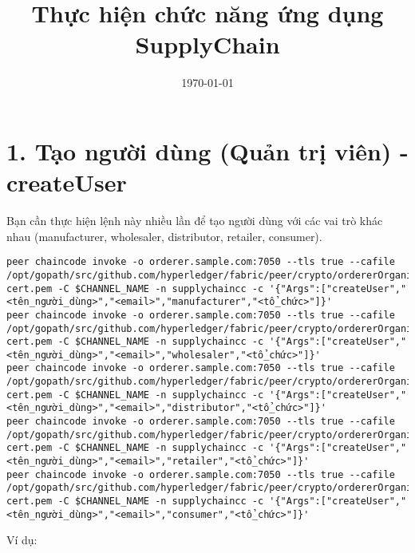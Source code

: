 \documentclass{article}
\title{Thực hiện chức năng ứng dụng SupplyChain}
\date{\today}
\begin{document}
\maketitle

\section{1. Tạo người dùng (Quản trị viên) - createUser}

Bạn cần thực hiện lệnh này nhiều lần để tạo người dùng với các vai trò khác nhau (manufacturer, wholesaler, distributor, retailer, consumer).

\begin{lstlisting}[breaklines=true]
peer chaincode invoke -o orderer.sample.com:7050 --tls true --cafile /opt/gopath/src/github.com/hyperledger/fabric/peer/crypto/ordererOrganizations/sample.com/orderers/orderer.sample.com/msp/tlscacerts/tlsca.sample.com-cert.pem -C $CHANNEL_NAME -n supplychaincc -c '{"Args":["createUser","<tên_người_dùng>","<email>","manufacturer","<tổ_chức>"]}'
peer chaincode invoke -o orderer.sample.com:7050 --tls true --cafile /opt/gopath/src/github.com/hyperledger/fabric/peer/crypto/ordererOrganizations/sample.com/orderers/orderer.sample.com/msp/tlscacerts/tlsca.sample.com-cert.pem -C $CHANNEL_NAME -n supplychaincc -c '{"Args":["createUser","<tên_người_dùng>","<email>","wholesaler","<tổ_chức>"]}'
peer chaincode invoke -o orderer.sample.com:7050 --tls true --cafile /opt/gopath/src/github.com/hyperledger/fabric/peer/crypto/ordererOrganizations/sample.com/orderers/orderer.sample.com/msp/tlscacerts/tlsca.sample.com-cert.pem -C $CHANNEL_NAME -n supplychaincc -c '{"Args":["createUser","<tên_người_dùng>","<email>","distributor","<tổ_chức>"]}'
peer chaincode invoke -o orderer.sample.com:7050 --tls true --cafile /opt/gopath/src/github.com/hyperledger/fabric/peer/crypto/ordererOrganizations/sample.com/orderers/orderer.sample.com/msp/tlscacerts/tlsca.sample.com-cert.pem -C $CHANNEL_NAME -n supplychaincc -c '{"Args":["createUser","<tên_người_dùng>","<email>","retailer","<tổ_chức>"]}'
peer chaincode invoke -o orderer.sample.com:7050 --tls true --cafile /opt/gopath/src/github.com/hyperledger/fabric/peer/crypto/ordererOrganizations/sample.com/orderers/orderer.sample.com/msp/tlscacerts/tlsca.sample.com-cert.pem -C $CHANNEL_NAME -n supplychaincc -c '{"Args":["createUser","<tên_người_dùng>","<email>","consumer","<tổ_chức>"]}'
\end{lstlisting}

Ví dụ:
\end{document}
